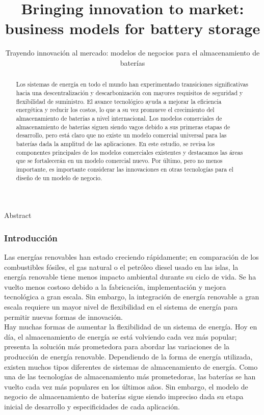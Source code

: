 \documentclass[10pt]{beamer}
\title{\Large Bringing innovation to market: business models for battery storage}
\subtitle{\tiny Trayendo innovación al mercado: modelos de negocios para el almacenamiento de baterías}
\date{Josue Huaroto Villavicencio \\[90pt]\today  \\[10pt] \vskip1ex Universidad Nacional de Ingeniería - Facultad de Ingeniería Mecánica}
\begin{document}
\begin{frame}
\maketitle
\end{frame}
\begin{frame}{Abstract}
\begin{abstract}
Los sistemas de energía en todo el mundo han experimentado transiciones significativas hacia una descentralización y descarbonización con mayores requisitos de seguridad y flexibilidad de suministro. El avance tecnológico ayuda a mejorar la eficiencia energética y reducir los costos, lo que a su vez promueve el crecimiento del almacenamiento de baterías a nivel internacional. Los modelos comerciales de almacenamiento de baterías siguen siendo vagos debido a sus primeras etapas de desarrollo, pero está claro que no existe un modelo comercial universal para las baterías dada la amplitud de las aplicaciones. En este estudio, se revisa los componentes principales de los modelos comerciales existentes y destacamos las áreas que se fortalecerán en un modelo comercial nuevo. Por último, pero no menos importante, es importante considerar las innovaciones en otras tecnologías para el diseño de un modelo de negocio.
\end{abstract}
\end{frame}
\begin{frame}
\frametitle{Introducción}
Las energías renovables han estado creciendo rápidamente; en comparación de los combustibles fósiles, el gas natural o el petróleo diesel usado en las islas, la energía renovable tiene menos impacto ambiental durante su ciclo de vida. Se ha vuelto menos costoso debido a la fabricación, implementación y mejora tecnológica a gran escala. Sin embargo, la integración de energía renovable a gran escala requiere un mayor nivel de flexibilidad en el sistema de energía para permitir nuevas formas de innovación.\\
Hay muchas formas de aumentar la flexibilidad de un sistema de energía. Hoy en día, el almacenamiento de energía se está volviendo cada vez más popular; presenta la solución más prometedora para abordar las variaciones de la producción de energía renovable. Dependiendo de la forma de energía utilizada, existen muchos tipos diferentes de sistemas de almacenamiento de energía. Como una de las tecnologías de almacenamiento más prometedoras, las baterías se han vuelto cada vez más populares en los últimos años. Sin embargo, el modelo de negocio de almacenamiento de baterías sigue siendo impreciso dada su etapa inicial de desarrollo y especificidades de cada aplicación.
\end{frame}
\end{document}
